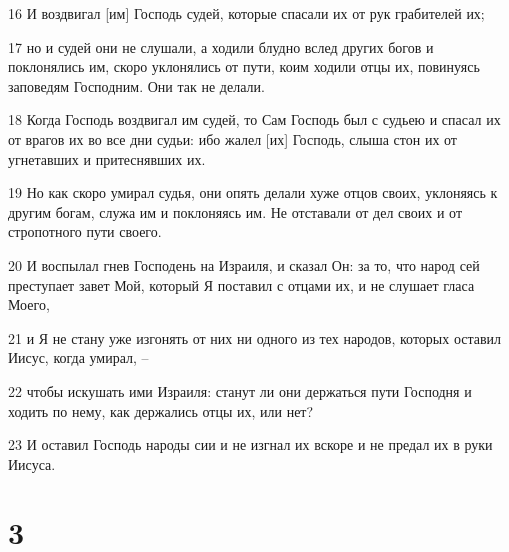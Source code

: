 \par 16 И воздвигал [им] Господь судей, которые спасали их от рук грабителей их;
\par 17 но и судей они не слушали, а ходили блудно вслед других богов и поклонялись им, скоро уклонялись от пути, коим ходили отцы их, повинуясь заповедям Господним. Они так не делали.
\par 18 Когда Господь воздвигал им судей, то Сам Господь был с судьею и спасал их от врагов их во все дни судьи: ибо жалел [их] Господь, слыша стон их от угнетавших и притеснявших их.
\par 19 Но как скоро умирал судья, они опять делали хуже отцов своих, уклоняясь к другим богам, служа им и поклоняясь им. Не отставали от дел своих и от стропотного пути своего.
\par 20 И воспылал гнев Господень на Израиля, и сказал Он: за то, что народ сей преступает завет Мой, который Я поставил с отцами их, и не слушает гласа Моего,
\par 21 и Я не стану уже изгонять от них ни одного из тех народов, которых оставил Иисус, когда умирал, --
\par 22 чтобы искушать ими Израиля: станут ли они держаться пути Господня и ходить по нему, как держались отцы их, или нет?
\par 23 И оставил Господь народы сии и не изгнал их вскоре и не предал их в руки Иисуса.

\chapter{3}

